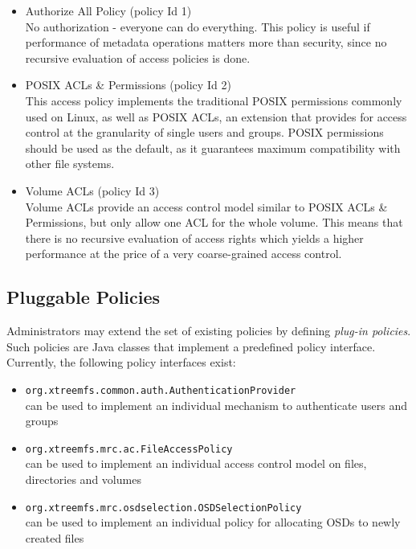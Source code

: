 \documentclass[a4paper,10pt]{book}
\begin{document}
\begin{itemize}
 \item Authorize All Policy (policy Id 1)\\
No authorization - everyone can do everything. This policy is useful if performance of metadata operations matters more than security, since no recursive evaluation of access policies is done.

 \item POSIX ACLs \& Permissions (policy Id 2)\\
This access policy implements the traditional POSIX permissions commonly used on Linux, as well as POSIX ACLs, an extension that provides for access control at the granularity of single users and groups. POSIX permissions should be used as the default, as it guarantees maximum compatibility with other file systems.

\item Volume ACLs (policy Id 3)\\
Volume ACLs provide an access control model similar to POSIX ACLs \& Permissions, but only allow one ACL for the whole volume. This means that there is no recursive evaluation of access rights which yields a higher performance at the price of a very coarse-grained access control. 
\end{itemize}


\subsection{Pluggable Policies}

Administrators may extend the set of existing policies by defining \textit{plug-in policies}. Such policies are Java classes that implement a predefined policy interface. Currently, the following policy interfaces exist:

\begin{itemize}
 \item \texttt{org.xtreemfs.common.auth.AuthenticationProvider}\\
   can be used to implement an individual mechanism to authenticate users and groups
 \item \texttt{org.xtreemfs.mrc.ac.FileAccessPolicy}\\
   can be used to implement an individual access control model on files, directories and volumes
 \item \texttt{org.xtreemfs.mrc.osdselection.OSDSelectionPolicy}\\
   can be used to implement an individual policy for allocating OSDs to newly created files
\end{itemize}
\end{document}
